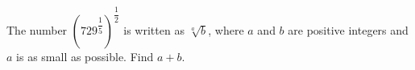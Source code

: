 The number $\left(729^{\dfrac15}\right)^{\dfrac12}$ is written as $\sqrt[a]{b}$, where $a$ and $b$ are positive integers and $a$ is as small as possible. Find $a+b$.
